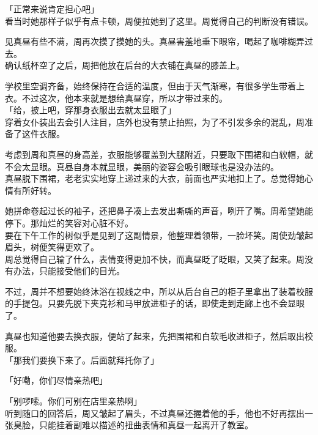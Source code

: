 「正常来说肯定担心吧」\\

看当时她那样子似乎有点卡顿，周便拉她到了这里。周觉得自己的判断没有错误。

见真昼有些不满，周再次摸了摸她的头。真昼害羞地垂下眼帘，喝起了咖啡糊弄过去。\\

确认纸杯空了之后，周把他放在后台的大衣铺在真昼的膝盖上。

学校里空调齐备，始终保持在合适的温度，但由于天气渐寒，有很多学生带着上衣。不过这次，他本来就是想给真昼穿，所以才带过来的。\\

「给，披上吧，穿那身衣服出去就太显眼了」\\

穿着女仆装出去会引人注目，店外也没有禁止拍照，为了不引发多余的混乱，周准备了这件衣服。

考虑到周和真昼的身高差，衣服能够覆盖到大腿附近，只要取下围裙和白软帽，就不会太显眼。真昼自身本就显眼，美丽的姿容会吸引眼球也是没办法的。\\

真昼脱下围裙，老老实实地穿上递过来的大衣，前面也严实地扣上了。总觉得她心情有所好转。

她拼命卷起过长的袖子，还把鼻子凑上去发出嘶嘶的声音，咧开了嘴。周希望她能停下。那灿烂的笑容对心脏不好。\\

要在下午工作的树似乎是见到了这副情景，他整理着领带，一脸坏笑。周使劲皱起眉头，树便笑得更欢了。\\

周总觉得自己输了什么，表情变得更加不快，而真昼眨了眨眼，又笑了起来。周没有办法，只能接受他们的目光。

不过，周并不想要始终沐浴在视线之中，所以从后台自己的柜子里拿出了装着校服的手提包。只要先脱下夹克衫和马甲放进柜子的话，即使走到走廊上也不会显眼了。

真昼也知道他要去换衣服，便站了起来，先把围裙和白软毛收进柜子，然后取出校服。\\

「那我们要换下来了。后面就拜托你了」

「好嘞，你们尽情亲热吧」

「别啰嗦。你们可别在店里亲热啊」\\

听到随口的回答后，周又皱起了眉头，不过真昼还握着他的手，他也不好再摆出一张臭脸，只能挂着副难以描述的扭曲表情和真昼一起离开了教室。\\

